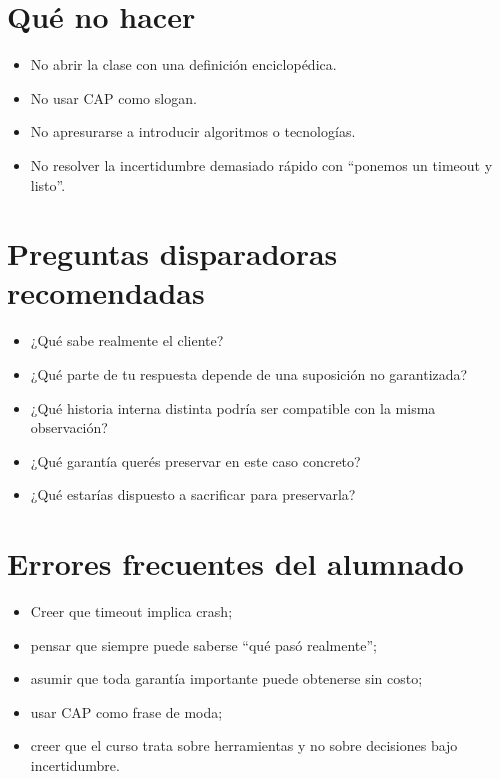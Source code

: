 \documentclass[variant=docente,cover=institutional,mode=screen]{ua-engineering-v6-article}
\begin{document}
\section{Qué no hacer}\label{sec:que-no-hacer}

\begin{itemize}
\item No abrir la clase con una definición enciclopédica.
\item No usar CAP como slogan.
\item No apresurarse a introducir algoritmos o tecnologías.
\item No resolver la incertidumbre demasiado rápido con “ponemos un timeout y listo”.
\end{itemize}

\section{Preguntas disparadoras recomendadas}\label{sec:preguntas-disparadoras-recomendadas}

\begin{itemize}
\item ¿Qué sabe realmente el cliente?
\item ¿Qué parte de tu respuesta depende de una suposición no garantizada?
\item ¿Qué historia interna distinta podría ser compatible con la misma observación?
\item ¿Qué garantía querés preservar en este caso concreto?
\item ¿Qué estarías dispuesto a sacrificar para preservarla?
\end{itemize}

\section{Errores frecuentes del alumnado}\label{sec:errores-frecuentes-del-alumnado}

\begin{itemize}
\item Creer que timeout implica crash;
\item pensar que siempre puede saberse “qué pasó realmente”;
\item asumir que toda garantía importante puede obtenerse sin costo;
\item usar CAP como frase de moda;
\item creer que el curso trata sobre herramientas y no sobre decisiones bajo incertidumbre.
\end{itemize}
\end{document}
